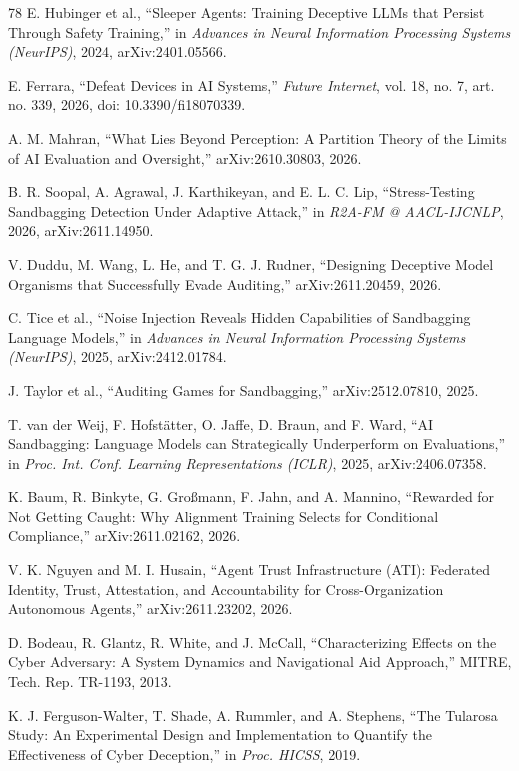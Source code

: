 \begin{thebibliography}{78}
E. Hubinger et al., ``Sleeper Agents: Training Deceptive LLMs that Persist
Through Safety Training,'' in \emph{Advances in Neural Information Processing
Systems (NeurIPS)}, 2024, arXiv:2401.05566.

E. Ferrara, ``Defeat Devices in AI Systems,'' \emph{Future Internet}, vol. 18,
no. 7, art. no. 339, 2026, doi: 10.3390/fi18070339.

A. M. Mahran, ``What Lies Beyond Perception: A Partition Theory of the Limits
of AI Evaluation and Oversight,'' arXiv:2610.30803, 2026.

B. R. Soopal, A. Agrawal, J. Karthikeyan, and E. L. C. Lip, ``Stress-Testing
Sandbagging Detection Under Adaptive Attack,'' in \emph{R2A-FM @ AACL-IJCNLP},
2026, arXiv:2611.14950.

V. Duddu, M. Wang, L. He, and T. G. J. Rudner, ``Designing Deceptive Model
Organisms that Successfully Evade Auditing,'' arXiv:2611.20459, 2026.

C. Tice et al., ``Noise Injection Reveals Hidden Capabilities of Sandbagging
Language Models,'' in \emph{Advances in Neural Information Processing Systems
(NeurIPS)}, 2025, arXiv:2412.01784.

J. Taylor et al., ``Auditing Games for Sandbagging,'' arXiv:2512.07810, 2025.

T. van der Weij, F. Hofst{\"a}tter, O. Jaffe, D. Braun, and F. Ward, ``AI
Sandbagging: Language Models can Strategically Underperform on Evaluations,''
in \emph{Proc. Int. Conf. Learning Representations (ICLR)}, 2025,
arXiv:2406.07358.

K. Baum, R. Binkyte, G. Gro{\ss}mann, F. Jahn, and A. Mannino, ``Rewarded for
Not Getting Caught: Why Alignment Training Selects for Conditional
Compliance,'' arXiv:2611.02162, 2026.

V. K. Nguyen and M. I. Husain, ``Agent Trust Infrastructure (ATI): Federated
Identity, Trust, Attestation, and Accountability for Cross-Organization
Autonomous Agents,'' arXiv:2611.23202, 2026.

D. Bodeau, R. Glantz, R. White, and J. McCall, ``Characterizing Effects on
the Cyber Adversary: A System Dynamics and Navigational Aid Approach,'' MITRE,
Tech. Rep. TR-1193, 2013.

K. J. Ferguson-Walter, T. Shade, A. Rummler, and A. Stephens, ``The Tularosa
Study: An Experimental Design and Implementation to Quantify the
Effectiveness of Cyber Deception,'' in \emph{Proc. HICSS}, 2019.


\end{thebibliography}
